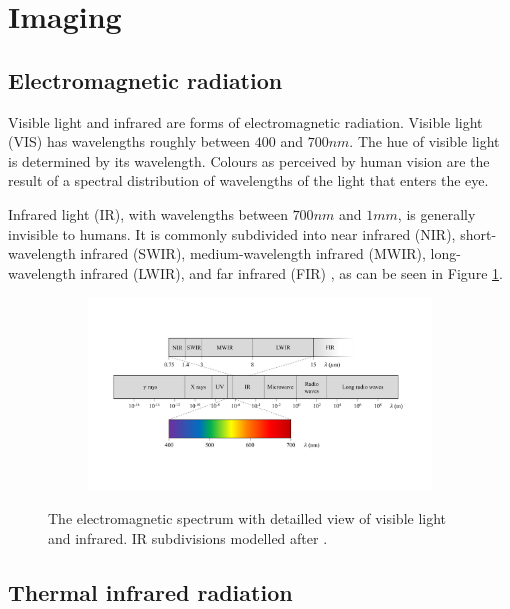 \documentclass{l4proj}
\begin{document}
\section{Imaging}
\label{imaging}

\subsection{Electromagnetic radiation}

Visible light and infrared are forms of electromagnetic radiation. Visible light (VIS) has wavelengths roughly between $400$ and $700 nm$. The hue of visible light is determined by its wavelength. Colours as perceived by human vision are the result of a spectral distribution of wavelengths of the light that enters the eye. 

Infrared light (IR), with wavelengths between $700 nm$ and $1 mm$, is generally invisible to humans. It is commonly subdivided into near infrared (NIR), short-wavelength infrared (SWIR), medium-wavelength infrared (MWIR), long-wavelength infrared (LWIR), and far infrared (FIR) \citep[p. 28]{byrnes_unexploded_2008}, as can be seen in Figure \ref{fig:em_spectrum}.

\begin{figure}[ht]
  \centering
  \begin{subfigure}[h!]{0.9\textwidth}
    \includegraphics[width=\textwidth, trim={1.5cm 4cm 2cm 4cm}, clip=true]{images/EM_spectrum.pdf}
  \end{subfigure}
  \caption{The electromagnetic spectrum with detailled view of visible light and infrared. IR subdivisions modelled after \citet[p. 28]{byrnes_unexploded_2008}.}
  \label{fig:em_spectrum}
\end{figure}

\subsection{Thermal infrared radiation}
\end{document}
